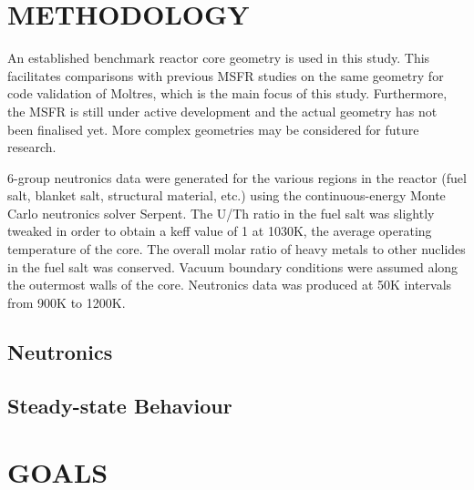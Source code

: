 \documentclass[letterpaper]{mandc2019}
\begin{document}
\section{METHODOLOGY}

An established benchmark reactor core geometry is used in this study. This facilitates comparisons with previous MSFR studies on the same geometry for code validation of Moltres, which is the main focus of this study. Furthermore, the MSFR is still under active development and the actual geometry has not been finalised yet. More complex geometries may be considered for future research.

6-group neutronics data were generated for the various regions in the reactor (fuel salt, blanket salt, structural material, etc.) using the continuous-energy Monte Carlo neutronics solver Serpent. The U/Th ratio in the fuel salt was slightly tweaked in order to obtain a keff value of 1 at 1030K, the average operating temperature of the core. The overall molar ratio of heavy metals to other nuclides in the fuel salt was conserved. Vacuum boundary conditions were assumed along the outermost walls of the core. Neutronics data was produced at 50K intervals from 900K to 1200K.

\subsection{Neutronics}

\subsection{Steady-state Behaviour}

\section{GOALS}

\setlength{\baselineskip}{12pt}


\end{document}
